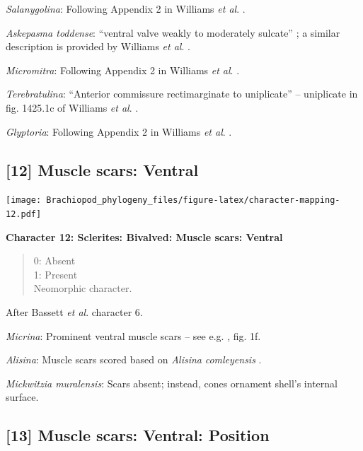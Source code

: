\documentclass[]{book}
\theoremstyle{definition}
\theoremstyle{definition}
\theoremstyle{definition}
\theoremstyle{remark}
\begin{document}
\emph{Salanygolina}: Following Appendix 2 in Williams \emph{et al}.
\citeyearpar{Williams1998Thediversity}.

\emph{Askepasma toddense}: ``ventral valve weakly to moderately
sulcate'' \citep{Topper2013Theoldest}; a similar description is provided
by Williams \emph{et al}.
\citeyearpar{Williams2000BrachiopodaLinguliformea}.

\emph{Micromitra}: Following Appendix 2 in Williams \emph{et al}.
\citeyearpar{Williams1998Thediversity}.

\emph{Terebratulina}: ``Anterior commissure rectimarginate to
uniplicate'' -- uniplicate in fig. 1425.1c of Williams \emph{et al}.
\citeyearpar{Williams2006Rhynchonelliformeapart}.

\emph{Glyptoria}: Following Appendix 2 in Williams \emph{et al}.
\citeyearpar{Williams1998Thediversity}.

\hypertarget{muscle-scars-ventral}{%
\subsection*{{[}12{]} Muscle scars:
Ventral}\label{muscle-scars-ventral}}

\texttt{[image: Brachiopod\_phylogeny\_files/figure-latex/character-mapping-12.pdf]}

\textbf{Character 12: Sclerites: Bivalved: Muscle scars: Ventral }

\begin{quote}
0: Absent\\
1: Present\\
Neomorphic character.
\end{quote}

After Bassett \emph{et al}.
\citeyearpar{Bassett2001Functionalmorphology} character 6.

\emph{Micrina}: Prominent ventral muscle scars -- see e.g.
\citet{Holmer2008TheEarly}, fig. 1f.

\emph{Alisina}: Muscle scars scored based on \emph{Alisina}
\emph{comleyensis} \citep{Bassett2001Functionalmorphology}.

\emph{Mickwitzia muralensis}: Scars absent; instead, cones ornament
shell's internal surface.

\hypertarget{muscle-scars-ventral-position}{%
\subsection*{{[}13{]} Muscle scars: Ventral:
Position}\label{muscle-scars-ventral-position}}
\end{document}
